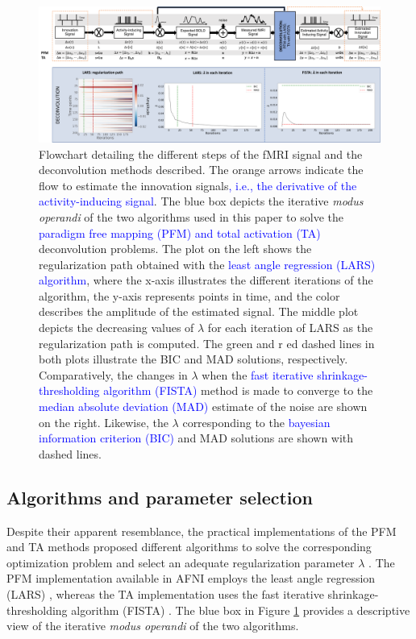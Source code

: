 \begin{figure}[t!]
    \begin{center}
        \includegraphics[width=\columnwidth]{figures/flowchart.pdf}
    \end{center}
    \caption{Flowchart detailing the different steps of the fMRI signal and the
    deconvolution methods described. The orange arrows indicate the flow to
    estimate the innovation signals\textcolor{blue}{, i.e., the derivative of
    the activity-inducing signal}. The blue box depicts the iterative
    \textit{modus operandi} of the two algorithms used in this paper to solve
    the \textcolor{blue}{paradigm free mapping (PFM) and total activation (TA)}
    deconvolution problems. The plot on the left shows the regularization path
    obtained with the \textcolor{blue}{least angle regression (LARS) algorithm},
    where the x-axis illustrates the different iterations of the algorithm, the
    y-axis represents points in time, and the color describes the amplitude of
    the estimated signal. The middle plot depicts the decreasing values of
    $\lambda$ for each iteration of LARS as the regularization path is computed.
    The green and r ed dashed lines in both plots illustrate the BIC and MAD
    solutions, respectively. Comparatively, the changes in $\lambda$ when the
    \textcolor{blue}{fast iterative shrinkage-thresholding algorithm (FISTA)}
    method is made to converge to the \textcolor{blue}{median absolute deviation
    (MAD)} estimate of the noise are shown on the right. Likewise, the $\lambda$
    corresponding to the \textcolor{blue}{bayesian information criterion (BIC)}
    and MAD solutions are shown with dashed lines.}
\label{fig:flowchart}
\end{figure}

\subsection{Algorithms and parameter selection}
\label{sec:regparam}
Despite their apparent resemblance, the practical implementations of the PFM and
TA methods proposed different algorithms to solve the corresponding optimization
problem and select an adequate regularization parameter $\lambda$
\citep{Gaudes2013Paradigmfreemapping,Karahanoglu2013TotalactivationfMRI}. The
PFM implementation available in AFNI employs the least angle regression (LARS)
\citep{Efron2004Leastangleregression}, whereas the TA implementation uses the
fast iterative shrinkage-thresholding algorithm (FISTA)
\citep{Beck2009FastIterativeShrinkage}. The blue box in Figure
\ref{fig:flowchart} provides a descriptive view of the iterative \textit{modus
operandi} of the two algorithms.

